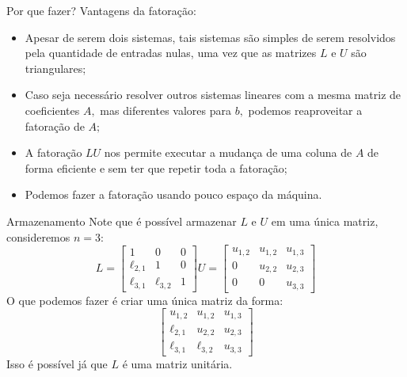 \documentclass[]{beamer}
\begin{document}
\begin{frame}{Por que fazer?}
Vantagens da fatoração:
\begin{itemize}
\item Apesar de serem dois sistemas, tais sistemas são simples de serem resolvidos pela quantidade de entradas nulas, uma vez que as matrizes $L$ e $U$ são triangulares;

\item  Caso seja necessário resolver outros sistemas lineares com a mesma matriz de coeficientes $A,$ mas diferentes valores para $b,$ podemos reaproveitar a fatoração de $A;$

\item A fatoração $LU$ nos permite executar a mudança de uma coluna de $A$ de forma eficiente e sem ter que repetir toda a fatoração;

\item Podemos fazer a fatoração usando pouco espaço da máquina.
\end{itemize}

\end{frame}

\begin{frame}{Armazenamento}
Note que é possível armazenar $L$ e $U$ em uma única matriz, consideremos $n =3:$
$$L=\begin{bmatrix}1&0&0\\ \ell_{2,1}&1&0\\ \ell_{3,1}&\ell_{3,2}&1\end{bmatrix} U = \begin{bmatrix}u_{1,2}&u_{1,2}&u_{1,3}\\ 0&u_{2,2}&u_{2,3}\\ 0&0&u_{3,3}\end{bmatrix}$$ 
O que podemos fazer é criar uma única matriz da forma:
$$\begin{bmatrix}u_{1,2}&u_{1,2}&u_{1,3}\\ \ell_{2,1}&u_{2,2}&u_{2,3}\\ \ell_{3,1}&\ell_{3,2}&u_{3,3}\end{bmatrix}$$ 
Isso é possível já que $L$ é uma matriz unitária.
\end{frame}
\end{document}
